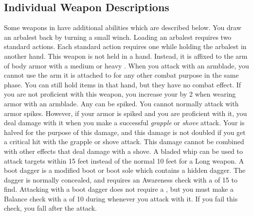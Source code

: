     \subsection{Individual Weapon Descriptions}
        Some weapons in  have additional abilities which are described below.
         You draw an arbalest back by turning a small winch. Loading an arbalest requires two standard actions.
        Each standard action requires one  while holding the arbalest in another hand.
         This weapon is not held in a hand.
        Instead, it is affixed to the arm of body armor with a medium or heavy .
        When you attack with an armblade, you cannot use the arm it is attached to for any other combat purpose in the same phase.
        You can still hold items in that hand, but they have no combat effect.
        If you are not proficient with this weapon, you increase your  by 2 when wearing armor with an armblade.
         Any  can be spiked.
        You cannot normally attack with armor spikes.
        However, if your armor is spiked and you are proficient with it, you deal damage with it when you make a successful \textit{grapple} or \textit{shove} attack.
        Your  is halved for the purpose of this damage, and this damage is not doubled if you get a critical hit with the grapple or shove attack.
        This damage cannot be combined with other effects that deal damage with a shove.
         A bladed whip can be used to attack targets within 15 feet instead of the normal 10 feet for a Long weapon.
         A boot dagger is a modified boot or boot sole which contains a hidden dagger.
        The dagger is normally concealed, and requires an Awareness check with a  of 15 to find.
        Attacking with a boot dagger does not require a , but you must make a Balance check with a  of 10 during whenever you attack with it.
        If you fail this check, you fall \prone after the attack.

